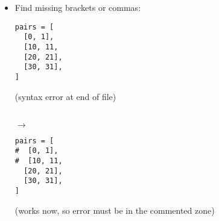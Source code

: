 \documentclass{handout}
\begin{document}
\begin{multicols}{2}
\begin{itemize}
\item Find missing brackets or commas: \\
\noindent
\begin{minipage}[t]{0.42\columnwidth}
\begin{lstlisting}
pairs = [
  [0, 1],
  [10, 11,
  [20, 21],
  [30, 31],
]
\end{lstlisting}
(syntax error at end of file)
\end{minipage}
\begin{minipage}[t]{0.05\columnwidth}
\  \\
\hspace*{1ex}$\rightarrow$
\end{minipage}
\begin{minipage}[t]{0.42\columnwidth}
\begin{lstlisting}
pairs = [
#  [0, 1],
#  [10, 11,
  [20, 21],
  [30, 31],
]
\end{lstlisting}
(works now, so error must be in the commented zone)
\end{minipage}

\end{itemize}

\end{multicols}
\end{document}
